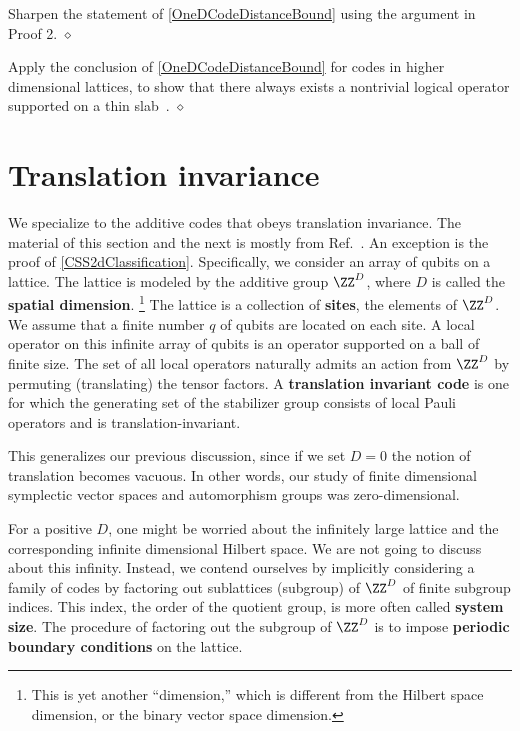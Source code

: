 \begin{exc}
Sharpen the statement of \ref{OneDCodeDistanceBound}
using the argument in Proof 2.
\hfill $\diamond$ \end{exc}

\begin{exc}
Apply the conclusion of \ref{OneDCodeDistanceBound}
for codes in higher dimensional lattices,
to show that there always exists a nontrivial logical operator
supported on a thin slab~\cite{BravyiTerhal2009no-go, HaahPreskill2012tradeoff}.
\hfill $\diamond$ \end{exc}


\section{Translation invariance}


We specialize to the additive codes that obeys translation invariance.
The material of this section and the next is 
mostly from Ref.~\cite{Haah2012PauliModule}.
An exception is the proof of \ref{CSS2dClassification}.
Specifically, we consider an array of qubits on a lattice.
The lattice is modeled by the additive group $\ZZ^D$,
where $D$ is called the {\bf spatial dimension}.%
\footnote{
This is yet another ``dimension,''
which is different from the Hilbert space dimension,
or the binary vector space dimension.
}
The lattice is a collection of {\bf sites}, the elements of $\ZZ^D$.
We assume that a finite number $q$ of qubits are located on each site.
A local operator on this infinite array of qubits
is an operator supported on a ball of finite size.
The set of all local operators naturally admits an action from $\ZZ^D$
by permuting (translating) the tensor factors.
A {\bf translation invariant code} is one for which the generating set
of the stabilizer group consists of local Pauli operators and 
is translation-invariant.

This generalizes our previous discussion,
since if we set $D=0$ the notion of translation becomes vacuous.
In other words, our study of finite dimensional symplectic vector spaces
and automorphism groups was zero-dimensional.

For a positive $D$, 
one might be worried about the infinitely large lattice and the corresponding
infinite dimensional Hilbert space.
We are not going to discuss about this infinity.
Instead, we contend ourselves by implicitly considering a family of codes
by factoring out sublattices (subgroup) of $\ZZ^D$ of finite subgroup indices.
This index, the order of the quotient group,
is more often called {\bf system size}.
The procedure of factoring out the subgroup of $\ZZ^D$
is to impose {\bf periodic boundary conditions} on the lattice.

